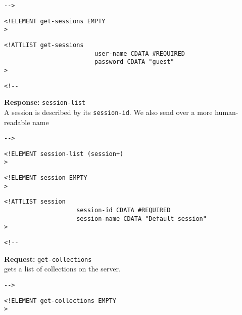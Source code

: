 \documentclass{article}
\newcommand{\requesttitle}[1]{\textbf{Request: }{\texttt{#1}}\\}
\newcommand{\responsetitle}[1]{\textbf{Response: }{\texttt{#1}}\\}
\newcommand{\tag}[1]{\texttt{#1}}
\begin{document}
       
 \begin{verbatim}-->\end{verbatim}



\begin{verbatim}
<!ELEMENT get-sessions EMPTY 
>\end{verbatim}

\begin{verbatim}
<!ATTLIST get-sessions 
                         user-name CDATA #REQUIRED
                         password CDATA "guest"
>\end{verbatim}

\begin{verbatim}<!--\end{verbatim}
  

     \responsetitle{session-list}
     
     A session is described by its \tag{session-id}. 
     We also send over a more human-readable name


       
 \begin{verbatim}-->\end{verbatim}



\begin{verbatim}
<!ELEMENT session-list (session+) 
>\end{verbatim}

\begin{verbatim}
<!ELEMENT session EMPTY 
>\end{verbatim}

\begin{verbatim}
<!ATTLIST session 
                    session-id CDATA #REQUIRED
                    session-name CDATA "Default session"
>\end{verbatim}

\begin{verbatim}<!--\end{verbatim}
   

     \requesttitle{get-collections}

     gets a list of collections on the server.

        
 \begin{verbatim}-->\end{verbatim}



\begin{verbatim}
<!ELEMENT get-collections EMPTY 
>\end{verbatim}
\end{document}
